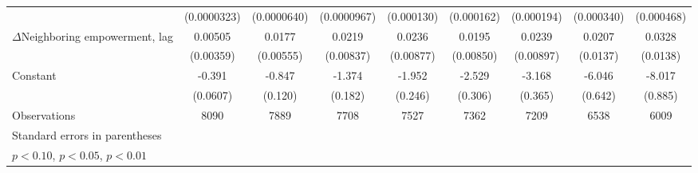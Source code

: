 \begin{table}[htbp]
\begin{tabular}{l*{8}{c}}
                    & (0.0000323)         & (0.0000640)         & (0.0000967)         &  (0.000130)         &  (0.000162)         &  (0.000194)         &  (0.000340)         &  (0.000468)         \\
[1em]
$\Delta$Neighboring empowerment, lag&     0.00505         &      0.0177\sym{***}&      0.0219\sym{***}&      0.0236\sym{***}&      0.0195\sym{**} &      0.0239\sym{***}&      0.0207         &      0.0328\sym{**} \\
                    &   (0.00359)         &   (0.00555)         &   (0.00837)         &   (0.00877)         &   (0.00850)         &   (0.00897)         &    (0.0137)         &    (0.0138)         \\
[1em]
Constant            &      -0.391\sym{***}&      -0.847\sym{***}&      -1.374\sym{***}&      -1.952\sym{***}&      -2.529\sym{***}&      -3.168\sym{***}&      -6.046\sym{***}&      -8.017\sym{***}\\
                    &    (0.0607)         &     (0.120)         &     (0.182)         &     (0.246)         &     (0.306)         &     (0.365)         &     (0.642)         &     (0.885)         \\
\hline
Observations        &        8090         &        7889         &        7708         &        7527         &        7362         &        7209         &        6538         &        6009         \\
\hline\hline
\multicolumn{9}{l}{\footnotesize Standard errors in parentheses}\\
\multicolumn{9}{l}{\footnotesize \sym{*} \(p<0.10\), \sym{**} \(p<0.05\), \sym{***} \(p<0.01\)}\\
\end{tabular}
\end{table}
